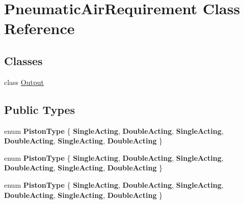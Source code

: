 \hypertarget{class_pneumatic_air_requirement}{}\section{Pneumatic\+Air\+Requirement Class Reference}
\label{class_pneumatic_air_requirement}
\subsection*{Classes}
\begin{DoxyCompactItemize}
\item 
class \hyperlink{class_pneumatic_air_requirement_1_1_output}{Output}
\end{DoxyCompactItemize}
\subsection*{Public Types}
\begin{DoxyCompactItemize}
\item 
\mbox{\label{class_pneumatic_air_requirement_aa43374a59756771200d03c6e5aeffe1c}} 
enum {\bfseries Piston\+Type} \{ \newline
{\bfseries Single\+Acting}, 
{\bfseries Double\+Acting}, 
{\bfseries Single\+Acting}, 
{\bfseries Double\+Acting}, 
\newline
{\bfseries Single\+Acting}, 
{\bfseries Double\+Acting}
 \}
\item 
\mbox{\label{class_pneumatic_air_requirement_aa43374a59756771200d03c6e5aeffe1c}} 
enum {\bfseries Piston\+Type} \{ \newline
{\bfseries Single\+Acting}, 
{\bfseries Double\+Acting}, 
{\bfseries Single\+Acting}, 
{\bfseries Double\+Acting}, 
\newline
{\bfseries Single\+Acting}, 
{\bfseries Double\+Acting}
 \}
\item 
\mbox{\label{class_pneumatic_air_requirement_aa43374a59756771200d03c6e5aeffe1c}} 
enum {\bfseries Piston\+Type} \{ \newline
{\bfseries Single\+Acting}, 
{\bfseries Double\+Acting}, 
{\bfseries Single\+Acting}, 
{\bfseries Double\+Acting}, 
\newline
{\bfseries Single\+Acting}, 
{\bfseries Double\+Acting}
 \}
\end{DoxyCompactItemize}
